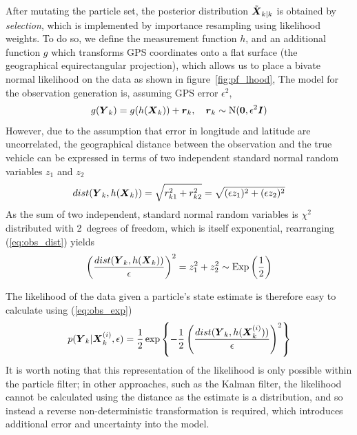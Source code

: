 After mutating the particle set, the posterior distribution $\tilde{\mbox{$\boldsymbol{X}$}}_{k|k}$ is obtained by
\emph{selection}, which is implemented by importance resampling using
likelihood weights.
To do so, we define the measurement function $h$,
and an additional function $g$ which transforms GPS coordinates onto a flat
surface (the geographical equirectangular projection),
which allows us to place a bivate normal likelihood on the data
as shown in figure~\ref{fig:pf_lhood},
The model for the observation generation is,
assuming GPS error $\epsilon^2$,
\begin{equation}
\label{eq:pf_obs_model}
g(\mbox{$\boldsymbol{Y}$}_k) = g(h(\mbox{$\boldsymbol{X}$}_k)) + \boldsymbol{r}_k,
\quad \boldsymbol{r}_k \sim \mathrm{N}(\boldsymbol{0}, \epsilon^2\boldsymbol{I})
\end{equation}
However, due to the assumption that error in longitude and latitude are uncorrelated, 
the geographical distance between the observation and the true vehicle can be expressed
in terms of two independent standard normal random variables $z_1$ and $z_2$
\begin{equation}
\label{eq:obs_dist}
dist(\mbox{$\boldsymbol{Y}$}_k, h(\mbox{$\boldsymbol{X}$}_k)) = \sqrt{r_{k1}^2 + r_{k2}^2} 
    = \sqrt{(\epsilon z_1)^2 + (\epsilon z_2)^2}
\end{equation}
As the sum of two independent, standard normal random variables 
is $\chi^2$ distributed with 2~degrees of freedom,
which is itself exponential,
rearranging (\ref{eq:obs_dist}) yields
\begin{equation}
\label{eq:obs_exp}
\left(\frac{dist(\mbox{$\boldsymbol{Y}$}_k, h(\mbox{$\boldsymbol{X}$}_k))}{\epsilon}\right)^2 =
z_1^2 + z_2^2 \sim \mathrm{Exp}\left(\frac{1}{2}\right)
\end{equation}

The likelihood of the data given a particle's state estimate 
is therefore easy to calculate using (\ref{eq:obs_exp})
\begin{equation}
p(\mbox{$\boldsymbol{Y}$}_k | \mbox{$\boldsymbol{X}$}_k^{(i)}, \epsilon) =
\frac{1}{2}\exp\left\{
-\frac{1}{2} \left(\frac{dist(\mbox{$\boldsymbol{Y}$}_k, h(\mbox{$\boldsymbol{X}$}_k^{(i)}))}{\epsilon}\right)^2
\right\}
\end{equation}
It is worth noting that this representation of the likelihood is only
possible within the particle filter;
in other approaches, such as the Kalman filter,
the likelihood cannot be calculated using the distance as the estimate
is a distribution, and so instead a reverse non-deterministic transformation
is required, which introduces additional error and uncertainty into the model.

